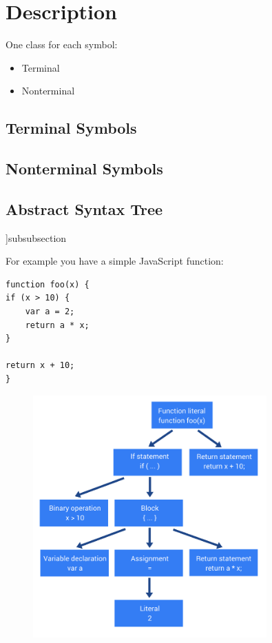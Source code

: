 
\section{Description}


One class for each symbol: 
\begin{itemize}
    \item Terminal
    \item Nonterminal
\end{itemize}


\subsection{Terminal Symbols}

\subsection{Nonterminal Symbols}

\subsection{Abstract Syntax Tree}

]subsubsection{}

For example you have a simple JavaScript function: 
\begin{verbatim}
function foo(x) {
if (x > 10) {
    var a = 2;
    return a * x;
}

return x + 10;
}
\end{verbatim}

\begin{figure}[H]
    \centering
        \includegraphics[width=0.8\textwidth]{figures/javascript_ast.png}
\end{figure}

